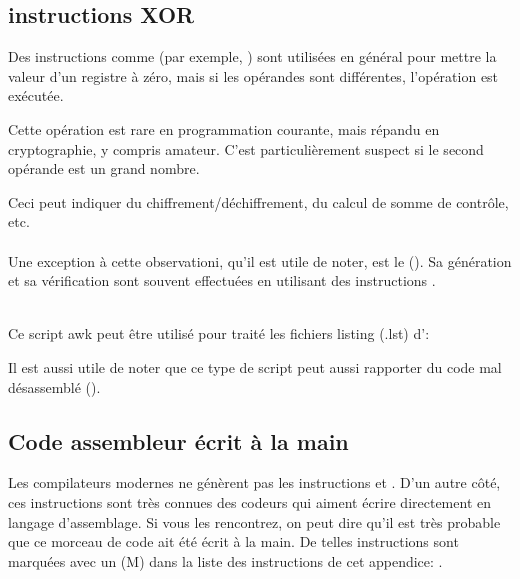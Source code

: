 
\subsection{instructions XOR}

Des instructions comme  (par exemple, ) sont utilisées
en général pour mettre la valeur d'un registre à zéro, mais si les opérandes sont
différentes, l'opération  est exécutée.

Cette opération est rare en programmation courante, mais répandu en cryptographie,
y compris amateur.
C'est particulièrement suspect si le second opérande est un grand nombre.

Ceci peut indiquer du chiffrement/déchiffrement, du calcul de somme de contrôle, etc.\\
\\

Une exception à cette observationi, qu'il est utile de noter, est le  ().
Sa génération et sa vérification sont souvent effectuées en utilisant des instructions
\XOR. \\
\\

Ce script awk peut être utilisé pour traité les fichiers listing (.lst) d'\IDA:



Il est aussi utile de noter que ce type de script peut aussi rapporter du code mal
désassemblé
().

\subsection{Code assembleur écrit à la main}


Les compilateurs modernes ne génèrent pas les instructions  et .
D'un autre côté, ces instructions sont très connues des codeurs qui aiment écrire
directement en langage d'assemblage.
Si vous les rencontrez, on peut dire qu'il est très probable que ce morceau de code
ait été écrit à la main.
De telles instructions sont marquées avec un (M) dans la liste des instructions de
cet appendice: .

